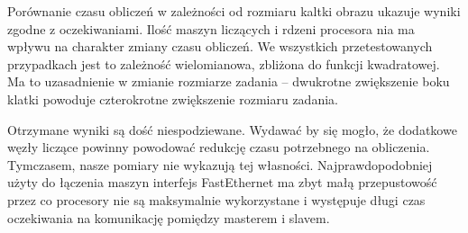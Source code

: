 \documentclass[a4paper]{article}
\begin{document}
Porównanie czasu obliczeń w zależności od rozmiaru kaltki obrazu ukazuje wyniki zgodne z oczekiwaniami. Ilość maszyn liczących i rdzeni procesora nia ma wpływu na charakter zmiany czasu obliczeń. We wszystkich przetestowanych przypadkach jest to zależność wielomianowa, zbliżona do funkcji kwadratowej. Ma to uzasadnienie w zmianie rozmiarze zadania – dwukrotne zwiększenie boku klatki powoduje czterokrotne zwiększenie rozmiaru zadania.

Otrzymane wyniki są dość niespodziewane. Wydawać by się mogło, że dodatkowe węzły liczące powinny powodować redukcję czasu potrzebnego na obliczenia. Tymczasem, nasze pomiary nie wykazują tej własności. Najprawdopodobniej użyty do łączenia maszyn interfejs FastEthernet ma zbyt małą przepustowość przez co procesory nie są maksymalnie wykorzystane i występuje długi czas oczekiwania na komunikację pomiędzy masterem i slavem.
\end{document}
